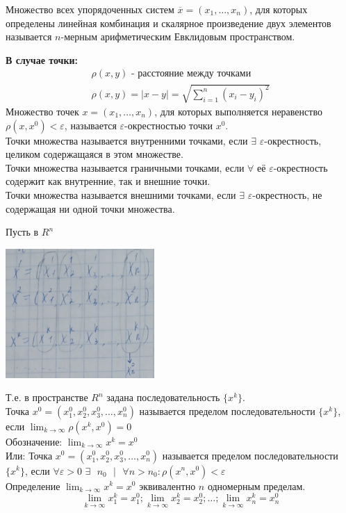 \documentclass[12pt]{article}
\let\ORIincludegraphics\includegraphics
\renewcommand{\includegraphics}[2][]{\ORIincludegraphics[scale=0.65,#1]{#2}}
\begin{document}
    Множество всех упорядоченных систем $\overline{x} = (x_1, \dots, x_n)$, для которых определены линейная комбинация и скалярное произведение двух элементов называется $n$-мерным арифметическим Евклидовым пространством.\par\noindent
    \textbf{В случае точки:}
    \begin{gather*}
        \rho (x,y) \text{ - расстояние между точками}\\
        \rho (x,y) = |x - y| = \sqrt{ \sum_{i = 1}^{n} (x_i - y_i)^2 }
    \end{gather*}
    Множество точек $x = (x_1, \dots, x_n)$, для которых выполняется неравенство $\rho (x, x^0) < \varepsilon$, называется $\varepsilon$-окрестностью точки $x^0$.\\
    Точки множества называется внутренними точками, если $\exists$ $\varepsilon$-окрестность, целиком содержащаяся в этом множестве.\\
    Точки множества называется граничными точками, если $\forall$ её $\varepsilon$-окрестность содержит как внутренние, так и внешние точки.\\
    Точки множества называется внешними точками, если $\exists$ $\varepsilon$-окрестность, не содержащая ни одной точки множества.\par\noindent
    Пусть в $R^n$
    \begin{center}
        \includegraphics{7.1.2.png}
    \end{center}
    Т.е. в пространстве $R^n$ задана последовательность $\{x^k\}$.\\
    Точка $x^0 = (x^0_1, x^0_2, x^0_3, \dots, x^0_n)$ называется пределом последовательности $\{x^k\}$, если $\lim_{k\to\infty} \rho(x^k, x^0) = 0$\\
    Обозначение: $\lim_{k\to\infty}x^k=x^0$\\
    Или: Точка $x^0 = (x^0_1, x^0_2, x^0_3, \dots, x^0_n)$ называется пределом последовательности $\{x^k\}$, если $\forall \varepsilon > 0$ $\exists \text{ } n_0 \text{ } \big| \text{ } \forall n > n_0 : \rho(x^n, x^0) < \varepsilon$\\
    Определение $\lim_{k\to\infty}x^k=x^0$ эквивалентно $n$ одномерным пределам.
    \[ \lim_{k\to\infty}x^k_1 = x^0_1; \lim_{k\to\infty}x^k_2 = x^0_2; \dots; \lim_{k\to\infty}x^k_n = x^0_n \]
\end{document}
